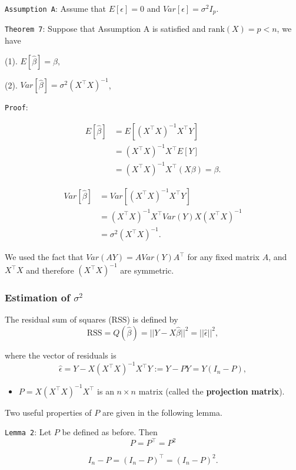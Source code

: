\documentclass[]{article}
\providecommand{\tightlist}{%
  \setlength{\itemsep}{0pt}\setlength{\parskip}{0pt}}
\begin{document}
\texttt{Assumption\ A}: Assume that \(E[\epsilon]=0\) and
\(Var[\epsilon]=\sigma^2I_p\).

\texttt{Theorem\ 7}: Suppose that Assumption A is satisfied and
\(\mathrm{rank}(X)=p<n\), we have

(1). \(E[\hat\beta]=\beta,\)

(2). \(Var[\hat\beta]=\sigma^2(X^\top X)^{-1}\),

\texttt{Proof}:

\[
\begin{align}
E[\hat\beta]&= E[(X^\top X)^{-1}X^{\top}Y] \\
&= (X^\top X)^{-1}X^{\top}E[Y]\\
&=(X^\top X)^{-1}X^{\top}(X\beta)=\beta.
\end{align}\]

\[
\begin{align}
Var[\hat\beta] &= Var[(X^\top X)^{-1}X^{\top}Y]\\
&=(X^\top X)^{-1}X^{\top}Var(Y)X(X^\top X)^{-1}\\
&=\sigma^2(X^\top X)^{-1}.
\end{align}
\]

We used the fact that \(Var(AY) = AVar(Y)A^\top\) for any fixed matrix
\(A\), and \(X^\top X\) and therefore \((X^\top X)^{-1}\) are symmetric.

\hypertarget{estimation-of-sigma2-1}{%
\subsubsection{\texorpdfstring{Estimation of
\(\sigma^2\)}{Estimation of \textbackslash{}sigma\^{}2}}\label{estimation-of-sigma2-1}}

The residual sum of squares (RSS) is defined by
\[\mathrm{RSS}=Q(\hat\beta)=||Y-X\hat\beta||^2=||\hat\epsilon||^2,\]

where the vector of residuals is
\[\hat\epsilon = Y-X(X^\top X)^{-1}X^\top Y:=Y-PY=Y(I_n-P),\]

\begin{itemize}
\tightlist
\item
  \(P=X(X^\top X)^{-1}X^\top\) is an \(n\times n\) matrix (called the
  \textbf{projection matrix}).
\end{itemize}

Two useful properties of \(P\) are given in the following lemma.

\texttt{Lemma\ 2}: Let \(P\) be defined as before. Then
\[P = P^\top=P^2\]

\[I_n-P = (I_n-P)^\top=(I_n-P)^2.\]
\end{document}
